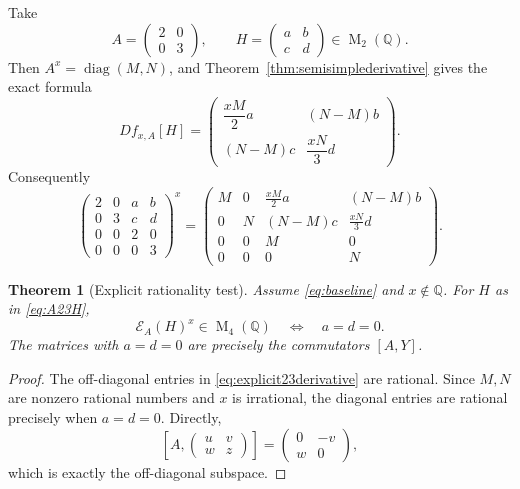 \documentclass[11pt,oneside]{article}
\newtheorem{theorem}{Theorem}[section]
\theoremstyle{definition}
\theoremstyle{remark}
\newcommand{\Q}{\mathbb Q}
\newcommand{\Mat}{\operatorname{M}}
\newcommand{\diag}{\operatorname{diag}}
\newcommand{\cE}{\mathcal E}
\begin{document}
Take
\begin{equation}
 A=\begin{pmatrix}2&0\\0&3\end{pmatrix},
 \qquad
 H=\begin{pmatrix}a&b\\c&d\end{pmatrix}\in\Mat_2(\Q).
 \label{eq:A23H}
\end{equation}
Then $A^x=\diag(M,N)$, and Theorem~\ref{thm:semisimplederivative} gives the exact formula
\begin{equation}
 Df_{x,A}[H]=
 \begin{pmatrix}
 \dfrac{xM}{2}a&(N-M)b\\[0.8ex]
 (N-M)c&\dfrac{xN}{3}d
 \end{pmatrix}.
 \label{eq:explicit23derivative}
\end{equation}
Consequently
\begin{equation}
 \begin{pmatrix}
 2&0&a&b\\
 0&3&c&d\\
 0&0&2&0\\
 0&0&0&3
 \end{pmatrix}^{\!x}
 =
 \begin{pmatrix}
 M&0&\frac{xM}{2}a&(N-M)b\\
 0&N&(N-M)c&\frac{xN}{3}d\\
 0&0&M&0\\
 0&0&0&N
 \end{pmatrix}.
 \label{eq:explicit4by4}
\end{equation}

\begin{theorem}[Explicit rationality test]
\label{thm:explicit23test}
Assume \eqref{eq:baseline} and $x\notin\Q$.  For $H$ as in \eqref{eq:A23H},
\begin{equation}
 \cE_A(H)^x\in\Mat_4(\Q)
 \quad\Longleftrightarrow\quad
 a=d=0.
 \label{eq:aanddzero}
\end{equation}
The matrices with $a=d=0$ are precisely the commutators $[A,Y]$.
\end{theorem}

\begin{proof}
The off-diagonal entries in \eqref{eq:explicit23derivative} are rational.  Since $M,N$ are
nonzero rational numbers and $x$ is irrational, the diagonal entries are rational precisely
when $a=d=0$.  Directly,
\[
 [A,\begin{pmatrix}u&v\\w&z\end{pmatrix}]
 =\begin{pmatrix}0&-v\\w&0\end{pmatrix},
\]
which is exactly the off-diagonal subspace.
\end{proof}
\end{document}

